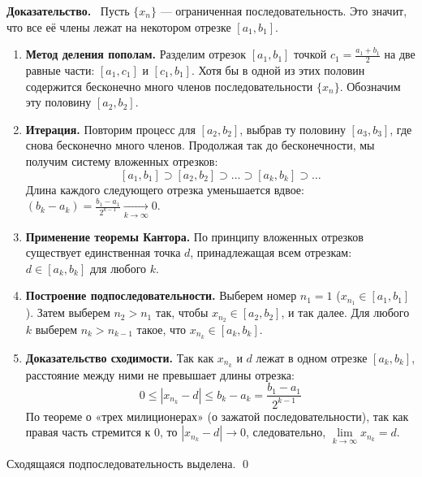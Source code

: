 \documentclass[a4paper,12pt]{article}
\newcommand{\myproof}{\textbf{Доказательство.}\ }
\begin{document}
	\myproof
	Пусть $\{x_n\}$ — ограниченная последовательность. Это значит, что все её члены лежат на некотором отрезке $[a_1, b_1]$.
	
	\begin{enumerate}
		\item \textbf{Метод деления пополам.} Разделим отрезок $[a_1, b_1]$ точкой $c_1 = \frac{a_1 + b_1}{2}$ на две равные части: $[a_1, c_1]$ и $[c_1, b_1]$. Хотя бы в одной из этих половин содержится бесконечно много членов последовательности $\{x_n\}$. Обозначим эту половину $[a_2, b_2]$.
		
		\item \textbf{Итерация.} Повторим процесс для $[a_2, b_2]$, выбрав ту половину $[a_3, b_3]$, где снова бесконечно много членов. Продолжая так до бесконечности, мы получим систему вложенных отрезков:
		\[ [a_1, b_1] \supset [a_2, b_2] \supset \dots \supset [a_k, b_k] \supset \dots \]
		Длина каждого следующего отрезка уменьшается вдвое: $(b_k - a_k) = \frac{b_1 - a_1}{2^{k-1}} \xrightarrow[k \to \infty]{} 0$.
		
		\item \textbf{Применение теоремы Кантора.} По принципу вложенных отрезков существует единственная точка $d$, принадлежащая всем отрезкам: $d \in [a_k, b_k]$ для любого $k$.
		
		\item \textbf{Построение подпоследовательности.} Выберем номер $n_1 = 1$ ($x_{n_1} \in [a_1, b_1]$). Затем выберем $n_2 > n_1$ так, чтобы $x_{n_2} \in [a_2, b_2]$, и так далее. Для любого $k$ выберем $n_k > n_{k-1}$ такое, что $x_{n_k} \in [a_k, b_k]$.
		
		\item \textbf{Доказательство сходимости.} Так как $x_{n_k}$ и $d$ лежат в одном отрезке $[a_k, b_k]$, расстояние между ними не превышает длины отрезка:
		\[ 0 \le |x_{n_k} - d| \le b_k - a_k = \frac{b_1 - a_1}{2^{k-1}} \]
		По теореме о «трех милиционерах» (о зажатой последовательности), так как правая часть стремится к $0$, то $|x_{n_k} - d| \to 0$, следовательно, $\lim\limits_{k \to \infty} x_{n_k} = d$.
	\end{enumerate}
	Сходящаяся подпоследовательность выделена. \qed
	
\end{document}

